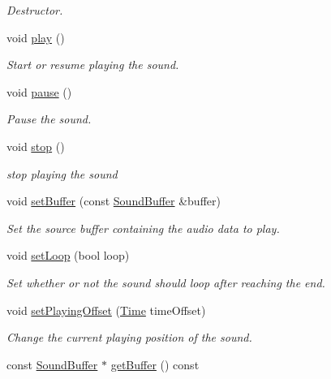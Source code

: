 \begin{DoxyCompactItemize}
\begin{DoxyCompactList}\small\item\em Destructor. \end{DoxyCompactList}\item 
void \hyperlink{classsf_1_1_sound_a2953ffe632536e72e696fd880ced2532}{play} ()
\begin{DoxyCompactList}\small\item\em Start or resume playing the sound. \end{DoxyCompactList}\item 
void \hyperlink{classsf_1_1_sound_a5eeb25815bfa8cdc4a6cc000b7b19ad5}{pause} ()
\begin{DoxyCompactList}\small\item\em Pause the sound. \end{DoxyCompactList}\item 
void \hyperlink{classsf_1_1_sound_aa9c91c34f7c6d344d5ee9b997511f754}{stop} ()
\begin{DoxyCompactList}\small\item\em stop playing the sound \end{DoxyCompactList}\item 
void \hyperlink{classsf_1_1_sound_a8b395e9713d0efa48a18628c8ec1972e}{set\+Buffer} (const \hyperlink{classsf_1_1_sound_buffer}{Sound\+Buffer} \&buffer)
\begin{DoxyCompactList}\small\item\em Set the source buffer containing the audio data to play. \end{DoxyCompactList}\item 
void \hyperlink{classsf_1_1_sound_af23ab4f78f975bbabac031102321612b}{set\+Loop} (bool loop)
\begin{DoxyCompactList}\small\item\em Set whether or not the sound should loop after reaching the end. \end{DoxyCompactList}\item 
void \hyperlink{classsf_1_1_sound_ab905677846558042022dd6ab15cddff0}{set\+Playing\+Offset} (\hyperlink{classsf_1_1_time}{Time} time\+Offset)
\begin{DoxyCompactList}\small\item\em Change the current playing position of the sound. \end{DoxyCompactList}\item 
const \hyperlink{classsf_1_1_sound_buffer}{Sound\+Buffer} $\ast$ \hyperlink{classsf_1_1_sound_a5f2f1ec6603f73625f393f0e9ab64476}{get\+Buffer} () const 

\end{DoxyCompactItemize}
